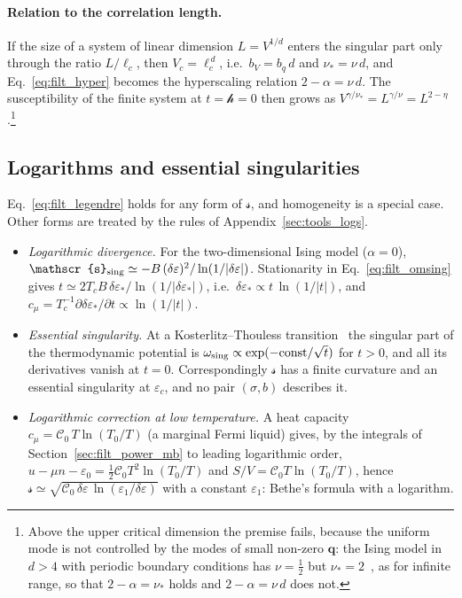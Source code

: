 \documentclass[10pt,a4paper]{article}
\theoremstyle{plain}
\newcommand{\hfield}{\mathscr{h}}  %
\newcommand{\lds}{\mathscr{s}}  %
\begin{document}
\paragraph{Relation to the correlation length.} If the size of a system of
linear dimension $L=V^{1/d}$ enters the singular part only through the ratio
$L/\ell_c$, then $V_c=\ell_c^{\,d}$, i.e.\ $b_V=b_q \, d$ and $\nu_*=\nu\,d$,
and Eq.~\eqref{eq:filt_hyper} becomes the hyperscaling relation
$2-\alpha=\nu\,d$. The susceptibility of the finite system at $t=\hfield=0$
then grows as $V^{\gamma/\nu_*}=L^{\gamma/\nu}=L^{2-\eta}$.\footnote{Above the
upper critical dimension the premise fails, because the uniform mode is not
controlled by the modes of small non-zero $\mathbf q$: the Ising model in
$d>4$ with periodic boundary conditions has $\nu=\tfrac12$ but
$\nu_*=2$~\cite{Brezin1982}, as for infinite range, so that
$2-\alpha=\nu_*$ holds and $2-\alpha=\nu\,d$ does not.}

\subsection{Logarithms and essential singularities}
\label{sec:filt_nonpower}

Eq.~\eqref{eq:filt_legendre} holds for any form of $\lds$, and homogeneity is
a special case. Other forms are treated by the rules of
Appendix~\ref{sec:tools_logs}.
\begin{itemize}\setlength{\itemsep}{0pt}
\item \emph{Logarithmic divergence.} For the two-dimensional Ising model
  ($\alpha=0$),
  $\lds_{\rm sing}\simeq-B\,(\delta\varepsilon)^{2}/\ln(1/|\delta\varepsilon|)$.
  Stationarity in Eq.~\eqref{eq:filt_omsing} gives
  $t\simeq2T_cB\,\delta\varepsilon_*/\ln(1/|\delta\varepsilon_*|)$, i.e.\
  $\delta\varepsilon_*\propto t\,\ln(1/|t|)$, and
  $c_\mu=T_c^{-1}\partial\delta\varepsilon_*/\partial t\propto\ln(1/|t|)$.
\item \emph{Essential singularity.} At a Kosterlitz--Thouless
  transition~\cite{Kosterlitz1974} the singular part of the thermodynamic
  potential is $\omega_{\rm sing}\propto\exp(-{\rm const}/\sqrt{t})$ for
  $t>0$, and all its derivatives vanish at $t=0$. Correspondingly $\lds$ has
  a finite curvature and an essential singularity at $\varepsilon_c$, and no
  pair $(\sigma,b)$ describes it.
\item \emph{Logarithmic correction at low temperature.} A heat capacity
  $c_\mu=\mathcal C_0\,T\ln(T_0/T)$ (a marginal Fermi liquid) gives, by the
  integrals of Section~\ref{sec:filt_power_mb} to leading logarithmic order,
  $u-\mu n-\varepsilon_0=\tfrac12\mathcal C_0T^{2}\ln(T_0/T)$ and
  $S/V=\mathcal C_0T\ln(T_0/T)$, hence
  $\lds\simeq\sqrt{\mathcal C_0\,\delta\varepsilon\,\ln(\varepsilon_1/\delta\varepsilon)}$
  with a constant $\varepsilon_1$: Bethe's formula with a logarithm.
\end{itemize}
\end{document}
